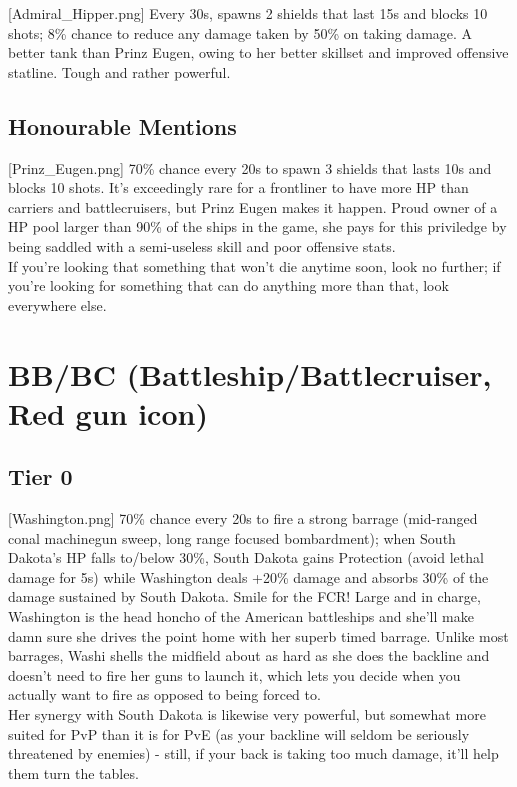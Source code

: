[Admiral_Hipper.png]
{Every 30s, spawns 2 shields that last 15s and blocks 10 shots; 8\% chance to reduce any damage taken by 50\% on taking damage.}
{}
{A better tank than Prinz Eugen, owing to her better skillset and improved offensive statline. Tough and rather powerful.}

 
\newpage
\subsection{ Honourable Mentions}
[Prinz_Eugen.png]
{70\% chance every 20s to spawn 3 shields that lasts 10s and blocks 10 shots.}
{}
{It's exceedingly rare for a frontliner to have more HP than carriers and battlecruisers, but Prinz Eugen makes it happen. Proud owner of a HP pool larger than 90\% of the ships in the game, she pays for this priviledge by being saddled with a semi-useless skill and poor offensive stats.\\
If you're looking that something that won't die anytime soon, look no further; if you're looking for something that can do anything more than that, look everywhere else.}

 
 
\newpage
\section[BB/BC]{BB/BC (Battleship/Battlecruiser, Red gun icon)}
 
\subsection{Tier 0}
[Washington.png]
{70\% chance every 20s to fire a strong barrage (mid-ranged conal machinegun sweep, long range focused bombardment); when South Dakota's HP falls to/below 30\%, South Dakota gains Protection (avoid lethal damage for 5s) while Washington deals +20\% damage and absorbs 30\% of the damage sustained by South Dakota.}
{Smile for the FCR!}
{Large and in charge, Washington is the head honcho of the American battleships and she'll make damn sure she drives the point home with her superb timed barrage. Unlike most barrages, Washi shells the midfield about as hard as she does the backline and doesn't need to fire her guns to launch it, which lets you decide when you actually want to fire as opposed to being forced to.\\
Her synergy with South Dakota is likewise very powerful, but somewhat more suited for PvP than it is for PvE (as your backline will seldom be seriously threatened by enemies) - still, if your back is taking too much damage, it'll help them turn the tables.}

